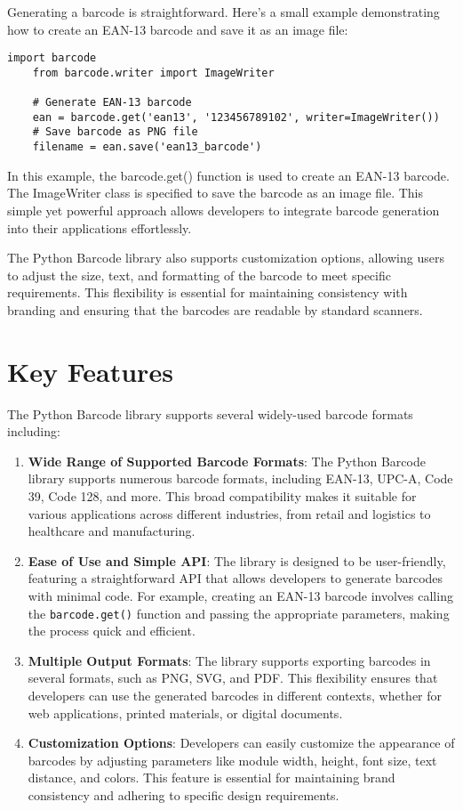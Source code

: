Generating a barcode is straightforward. Here’s a small example demonstrating how to create an EAN-13 barcode and save it as an image file:
\begin{lstlisting}[caption=Generating and Saving an EAN-13 Barcode]
	import barcode
	from barcode.writer import ImageWriter
	
	# Generate EAN-13 barcode
	ean = barcode.get('ean13', '123456789102', writer=ImageWriter())
	# Save barcode as PNG file
	filename = ean.save('ean13_barcode')
\end{lstlisting}

In this example, the barcode.get() function is used to create an EAN-13 barcode. The ImageWriter class is specified to save the barcode as an image file. This simple yet powerful approach allows developers to integrate barcode generation into their applications effortlessly.

The Python Barcode library also supports customization options, allowing users to adjust the size, text, and formatting of the barcode to meet specific requirements. This flexibility is essential for maintaining consistency with branding and ensuring that the barcodes are readable by standard scanners.

\section{Key Features}
The Python Barcode library supports several widely-used barcode formats including:

\begin{enumerate}
	\item \textbf{Wide Range of Supported Barcode Formats}: The Python Barcode library supports numerous barcode formats, including EAN-13, UPC-A, Code 39, Code 128, and more. This broad compatibility makes it suitable for various applications across different industries, from retail and logistics to healthcare and manufacturing.
	
	\item \textbf{Ease of Use and Simple API}: The library is designed to be user-friendly, featuring a straightforward API that allows developers to generate barcodes with minimal code. For example, creating an EAN-13 barcode involves calling the \texttt{barcode.get()} function and passing the appropriate parameters, making the process quick and efficient.\cite{Barrera:2020}
	
	\item \textbf{Multiple Output Formats}: The library supports exporting barcodes in several formats, such as PNG, SVG, and PDF. This flexibility ensures that developers can use the generated barcodes in different contexts, whether for web applications, printed materials, or digital documents.
	
	\item \textbf{Customization Options}: Developers can easily customize the appearance of barcodes by adjusting parameters like module width, height, font size, text distance, and colors. This feature is essential for maintaining brand consistency and adhering to specific design requirements.
\end{enumerate}

